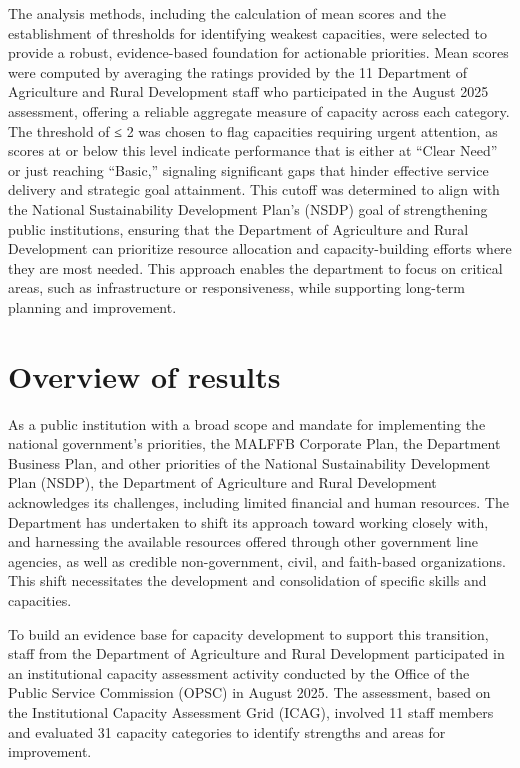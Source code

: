 \documentclass[
  10pt,
]{report}
\begin{document}
The analysis methods, including the calculation of mean scores and the
establishment of thresholds for identifying weakest capacities, were
selected to provide a robust, evidence-based foundation for actionable
priorities. Mean scores were computed by averaging the ratings provided
by the 11 Department of Agriculture and Rural Development staff who
participated in the August 2025 assessment, offering a reliable
aggregate measure of capacity across each category. The threshold of ≤ 2
was chosen to flag capacities requiring urgent attention, as scores at
or below this level indicate performance that is either at ``Clear
Need'' or just reaching ``Basic,'' signaling significant gaps that
hinder effective service delivery and strategic goal attainment. This
cutoff was determined to align with the National Sustainability
Development Plan's (NSDP) goal of strengthening public institutions,
ensuring that the Department of Agriculture and Rural Development can
prioritize resource allocation and capacity-building efforts where they
are most needed. This approach enables the department to focus on
critical areas, such as infrastructure or responsiveness, while
supporting long-term planning and improvement.

\section{Overview of results}\label{overview-of-results}

As a public institution with a broad scope and mandate for implementing
the national government's priorities, the MALFFB Corporate Plan, the
Department Business Plan, and other priorities of the National
Sustainability Development Plan (NSDP), the Department of Agriculture
and Rural Development acknowledges its challenges, including limited
financial and human resources. The Department has undertaken to shift
its approach toward working closely with, and harnessing the available
resources offered through other government line agencies, as well as
credible non-government, civil, and faith-based organizations. This
shift necessitates the development and consolidation of specific skills
and capacities.

To build an evidence base for capacity development to support this
transition, staff from the Department of Agriculture and Rural
Development participated in an institutional capacity assessment
activity conducted by the Office of the Public Service Commission (OPSC)
in August 2025. The assessment, based on the Institutional Capacity
Assessment Grid (ICAG), involved 11 staff members and evaluated 31
capacity categories to identify strengths and areas for improvement.
\end{document}
